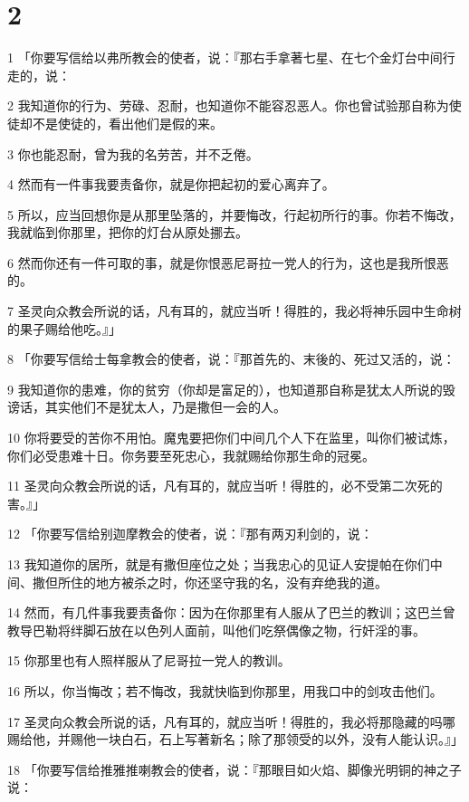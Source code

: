 \chapter{2}

\par 1 「你要写信给以弗所教会的使者，说：『那右手拿著七星、在七个金灯台中间行走的，说：
\par 2 我知道你的行为、劳碌、忍耐，也知道你不能容忍恶人。你也曾试验那自称为使徒却不是使徒的，看出他们是假的来。
\par 3 你也能忍耐，曾为我的名劳苦，并不乏倦。
\par 4 然而有一件事我要责备你，就是你把起初的爱心离弃了。
\par 5 所以，应当回想你是从那里坠落的，并要悔改，行起初所行的事。你若不悔改，我就临到你那里，把你的灯台从原处挪去。
\par 6 然而你还有一件可取的事，就是你恨恶尼哥拉一党人的行为，这也是我所恨恶的。
\par 7 圣灵向众教会所说的话，凡有耳的，就应当听！得胜的，我必将神乐园中生命树的果子赐给他吃。』」
\par 8 「你要写信给士每拿教会的使者，说：『那首先的、末後的、死过又活的，说：
\par 9 我知道你的患难，你的贫穷（你却是富足的），也知道那自称是犹太人所说的毁谤话，其实他们不是犹太人，乃是撒但一会的人。
\par 10 你将要受的苦你不用怕。魔鬼要把你们中间几个人下在监里，叫你们被试炼，你们必受患难十日。你务要至死忠心，我就赐给你那生命的冠冕。
\par 11 圣灵向众教会所说的话，凡有耳的，就应当听！得胜的，必不受第二次死的害。』」
\par 12 「你要写信给别迦摩教会的使者，说：『那有两刃利剑的，说：
\par 13 我知道你的居所，就是有撒但座位之处；当我忠心的见证人安提帕在你们中间、撒但所住的地方被杀之时，你还坚守我的名，没有弃绝我的道。
\par 14 然而，有几件事我要责备你：因为在你那里有人服从了巴兰的教训；这巴兰曾教导巴勒将绊脚石放在以色列人面前，叫他们吃祭偶像之物，行奸淫的事。
\par 15 你那里也有人照样服从了尼哥拉一党人的教训。
\par 16 所以，你当悔改；若不悔改，我就快临到你那里，用我口中的剑攻击他们。
\par 17 圣灵向众教会所说的话，凡有耳的，就应当听！得胜的，我必将那隐藏的吗哪赐给他，并赐他一块白石，石上写著新名；除了那领受的以外，没有人能认识。』」
\par 18 「你要写信给推雅推喇教会的使者，说：『那眼目如火焰、脚像光明铜的神之子说：

